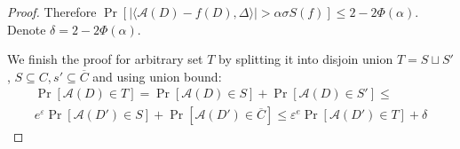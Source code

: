 \documentclass[12pt,letterpaper]{article}
\let\eps\varepsilon
\begin{document}
\begin{proof}
Therefore $\Pr[|\langle \mathcal{A}(D) - f(D), \Delta\rangle| > \alpha\sigma S(f)] \leq 2 - 2\Phi(\alpha)$. Denote $\delta = 2 - 2\Phi(\alpha)$. 

We finish the proof for arbitrary set $T$ by splitting it into disjoin union $T = S \sqcup S'$, $S \subseteq C, s' \subseteq \overline{C}$ and using union bound:
\begin{multline*}
  \Pr[\mathcal{A}(D) \in T] = \Pr[\mathcal{A}(D) \in S] + \Pr[\mathcal{A}(D) \in S'] \leq \\
  e^\eps\Pr[\mathcal{A}(D') \in S] + \Pr[\mathcal{A}(D') \in \overline{C}] \leq \eps^e \Pr[\mathcal{A}(D') \in T] + \delta
\end{multline*}
\end{proof}



\end{document}
